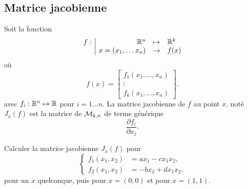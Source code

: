 \subsection{Matrice jacobienne}  \label{sec:MatJacob}

\begin{definition}
  Soit la fonction
  $$
  \begin{array}{r|rcl}
    f : & \mathbb{R}^n & \mapsto & \mathbb{R}^k \\
    & x = (x_1, \dots x_n) & \to & f(x)
  \end{array}
  $$
  où
  $$
  f(x) = \left[\begin{array}{c}
                f_1(x_1, \dots, x_n) \\
                \vdots \\
                f_k(x_1, \dots, x_n) 
               \end{array} \right].
  $$
  avec $f_i: \mathbb{R}^n \mapsto \mathbb{R}$ pour $i = 1 \dots n$.
  La matrice jacobienne de $f$ au point $x$, noté $J_x(f)$ est la matrice de $\mathcal{M}_{k, n}$ de terme générique 
  $$
  \frac{\partial f_i}{\partial x_j}.
  $$
\end{definition}

\begin{exercise*}
  Calculer la matrice jacobienne $J_x(f)$ pour
  $$
  \left\{\begin{array}{rl}
          f_1(x_1, x_2) & = a x_1 - c x_1 x_2, \\
          f_2(x_1, x_2) & = -b x_2 + d x_1 x_2.
         \end{array} \right.
  $$
pour un $x$ quelconque, puis pour $x = (0, 0)$ et pour $x=(1, 1)$.
\end{exercise*}

